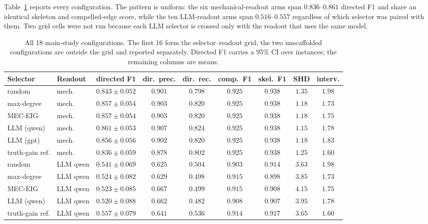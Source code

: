 \documentclass{article}
\begin{document}
Table~\ref{tab:grid} reports every configuration. The pattern is uniform: the six
mechanical-readout arms span $0.836$--$0.861$ directed F1 and share an identical skeleton and
compelled-edge score, while the ten LLM-readout arms span $0.516$--$0.557$ regardless of
which selector was paired with them. Two grid cells were not run because each LLM selector is
crossed only with the readout that uses the same model.

\begin{table}[h]
\caption{All 18 main-study configurations. The first 16 form the selector--readout grid; the
two unscaffolded configurations are outside the grid and reported separately. Directed F1
carries a 95\% CI over instances; the remaining columns are means.}
\label{tab:grid}
\centering
\small
\setlength{\tabcolsep}{4pt}
\begin{tabular}{llccccccc}
\toprule
Selector & Readout & directed F1 & dir.\ prec. & dir.\ rec. & comp.\ F1 & skel.\ F1 & SHD & interv. \\
\midrule
random & mech. & $0.843 \pm 0.052$ & $0.901$ & $0.798$ & $0.925$ & $0.938$ & $1.35$ & $1.98$ \\
max-degree & mech. & $0.857 \pm 0.054$ & $0.903$ & $0.820$ & $0.925$ & $0.938$ & $1.18$ & $1.73$ \\
MEC-EIG & mech. & $0.857 \pm 0.054$ & $0.903$ & $0.820$ & $0.925$ & $0.938$ & $1.18$ & $1.75$ \\
LLM (qwen) & mech. & $0.861 \pm 0.053$ & $0.907$ & $0.824$ & $0.925$ & $0.938$ & $1.15$ & $1.78$ \\
LLM (gpt) & mech. & $0.856 \pm 0.056$ & $0.902$ & $0.820$ & $0.925$ & $0.938$ & $1.18$ & $1.83$ \\
truth-gain ref. & mech. & $0.836 \pm 0.059$ & $0.878$ & $0.802$ & $0.925$ & $0.938$ & $1.25$ & $1.60$ \\
\midrule
random & LLM qwen & $0.541 \pm 0.069$ & $0.625$ & $0.504$ & $0.903$ & $0.914$ & $3.63$ & $1.98$ \\
max-degree & LLM qwen & $0.524 \pm 0.082$ & $0.629$ & $0.498$ & $0.915$ & $0.898$ & $3.85$ & $1.73$ \\
MEC-EIG & LLM qwen & $0.523 \pm 0.085$ & $0.667$ & $0.499$ & $0.915$ & $0.908$ & $4.15$ & $1.75$ \\
LLM (qwen) & LLM qwen & $0.520 \pm 0.088$ & $0.662$ & $0.482$ & $0.908$ & $0.907$ & $3.95$ & $1.78$ \\
truth-gain ref. & LLM qwen & $0.557 \pm 0.079$ & $0.641$ & $0.536$ & $0.914$ & $0.917$ & $3.65$ & $1.60$ \\

\end{tabular}
\end{table}
\end{document}
